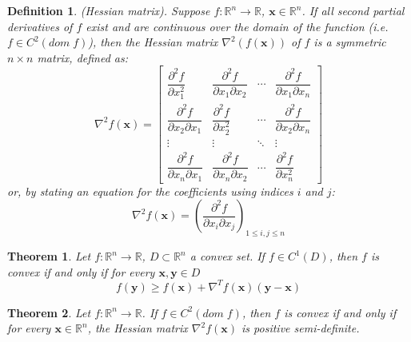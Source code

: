 \documentclass[12pt]{report}
\newtheorem{defn}{Definition}[section]
\newtheorem{thm}{Theorem}[section]
\numberwithin{equation}{section}
\begin{document}
\begin{defn}
\normalfont
(Hessian matrix).
Suppose $f:\mathbb{R}^n\rightarrow\mathbb{R}$, $\bm{x}\in\mathbb{R}^n$. If all second partial derivatives of $f$ exist and are continuous over the domain of the function (i.e. $f\in C^2(dom\; f)$), then the Hessian matrix $\nabla^2(f(\bm{x}))$ of $f$ is a symmetric $n\times n$ matrix, defined as:
\begin{equation}
\nabla^2 f(\bm{x})=\left[\begin{array}{cccc}
{\dfrac{\partial^{2} f}{\partial x_{1}^{2}}} & {\dfrac{\partial^{2} f}{\partial x_{1} \partial x_{2}}} & {\cdots} & {\dfrac{\partial^{2} f}{\partial x_{1} \partial x_{n}}} \\
 {\dfrac{\partial^{2} f}{\partial x_{2} \partial x_{1}}} & {\dfrac{\partial^{2} f}{\partial x_{2}^{2}}} & {\cdots} & {\dfrac{\partial^{2} f}{\partial x_{2} \partial x_{n}}} \\
  {\vdots} & {\vdots} & {\ddots} & {\vdots} \\ {\dfrac{\partial^{2} f}{\partial x_{n} \partial x_{1}}} & {\dfrac{\partial^{2} f}{\partial x_{n} \partial x_{2}}} & {\cdots} & {\dfrac{\partial^{2} f}{\partial x_{n}^{2}}}\end{array}\right]
\end{equation}
or, by stating an equation for the coefficients using indices $i$ and $j$:
\begin{equation}
\nabla^2 f(\bm{x}) = \left(\frac{\partial^{2} f}{\partial x_{i} \partial x_{j}}\right)_{1 \leq i, j \leq n}
\end{equation}
\end{defn}
\begin{thm}\label{thm:first_order}
Let $f:\mathbb{R}^n\rightarrow \mathbb{R}$, $D \subset \mathbb{R}^n$ a convex set. If $f\in C^1(D)$, then $f$ is convex if and only if for every $\bm{x},\bm{y} \in D$
\begin{equation}
f(\bm{y})  \geq  f(\bm{x}) + \nabla^T f(\bm{x}) (\bm{y}-\bm{x}) 
\end{equation}
\end{thm}
\begin{thm}\label{thm:second_order}
Let $f:\mathbb{R}^n\rightarrow \mathbb{R}$. If $f\in C^2(dom \; f)$, then $f$ is convex if and only if for every $\bm{x}\in\mathbb{R}^n$, the Hessian matrix $\nabla^2 f(\bm{x})$ is positive semi-definite.
\end{thm}
\end{document}
